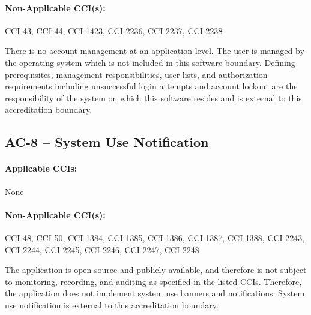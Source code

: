 \documentclass[letterpaper, 10pt, twoside]{article}
\begin{document}
\paragraph{Non-Applicable CCI(s):} CCI-43, CCI-44, CCI-1423, CCI-2236, CCI-2237, CCI-2238

There is no account management at an application level. The user is managed by the operating system which is not included in this software boundary. Defining prerequisites, management responsibilities, user lists, and authorization requirements including unsuccessful login attempts and account lockout are the responsibility of the system on which this software resides and is external to this accreditation boundary.

\subsection{AC-8 -- System Use Notification}

\paragraph{Applicable CCIs:} None

\paragraph{Non-Applicable CCI(s):} CCI-48, CCI-50, CCI-1384, CCI-1385, CCI-1386, CCI-1387, CCI-1388, CCI-2243, CCI-2244, CCI-2245, CCI-2246, CCI-2247, CCI-2248

The application is open-source and publicly available, and therefore is not subject to monitoring, recording, and auditing as specified in the listed CCIs. Therefore, the application does not implement system use banners and notifications. System use notification is external to this accreditation boundary.
\end{document}
